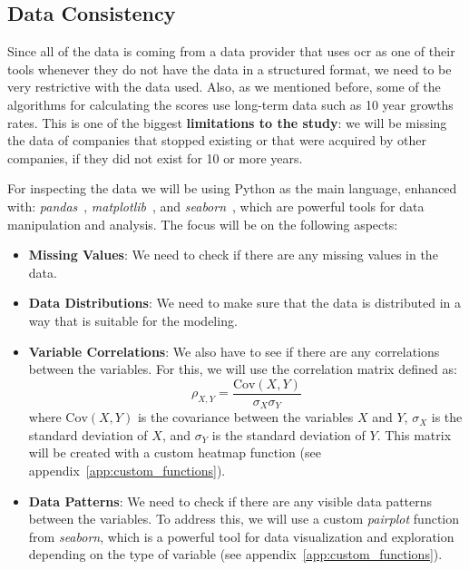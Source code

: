 \documentclass[11pt,english,a4paper,hidelinks]{book}
\begin{document}
\subsection{Data Consistency}

Since all of the data is coming from a data provider that uses \acrshort{ocr} as one of their tools whenever they do not have the data in a structured format, we need to be very restrictive with the data used. Also, as we mentioned before, some of the algorithms for calculating the scores use long-term data such as 10 year growths rates. This is one of the biggest \textbf{limitations to the study}: we will be missing the data of companies that stopped existing or that were acquired by other companies, if they did not exist for 10 or more years.

\vspace{0.5cm}
\noindent For inspecting the data we will be using Python as the main language, enhanced with: \textit{pandas}~\cite{pandas2025}, \textit{matplotlib}~\cite{matplotlib2025doc}, and \textit{seaborn}~\cite{seaborn2025}, which are powerful tools for data manipulation and analysis. The focus will be on the following aspects:
\begin{itemize}
  \item \textbf{Missing Values}: We need to check if there are any missing values in the data.
  \item \textbf{Data Distributions}: We need to make sure that the data is distributed in a way that is suitable for the modeling.
  \item \textbf{Variable Correlations}: We also have to see if there are any correlations between the variables. For this, we will use the correlation matrix defined as:
  \begin{equation}
    \rho_{X,Y} = \frac{\text{Cov}(X,Y)}{\sigma_X \sigma_Y}
  \end{equation}
  where \(\text{Cov}(X,Y)\) is the covariance between the variables \(X\) and \(Y\), \(\sigma_X\) is the standard deviation of \(X\), and \(\sigma_Y\) is the standard deviation of \(Y\). This matrix will be created with a custom heatmap function (see appendix~\ref{app:custom_functions}).
  \item \textbf{Data Patterns}: We need to check if there are any visible data patterns between the variables. To address this, we will use a custom \textit{\acrshort{pairplot}} function from \textit{seaborn}, which is a powerful tool for data visualization and exploration  depending on the type of variable (see appendix~\ref{app:custom_functions}).
\end{itemize}
\end{document}
